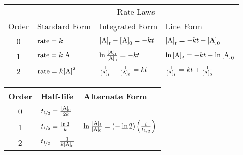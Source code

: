 \documentclass[10pt]{article}
\begin{document}
\begin{table}[H]
    \centering
        \begin{tabular}{clll}
            \toprule
                \multicolumn{1}{c}{} & \multicolumn{3}{c}{Rate Laws}\\
                \cmidrule(l){2-4} 
                Order & Standard Form & Integrated Form & Line Form \\
                \midrule
                0 & $\textnormal{rate}=k$ & $\textnormal{[A]}_t-\textnormal{[A]}_0=-kt$ & $\textnormal{[A]}_t=-kt+\textnormal{[A]}_0$   \\[10pt]
                1 & $\textnormal{rate}=k\textnormal{[A]}$ & $\ln\frac{\textnormal{[A]}_t}{\textnormal{[A]}_0}=-kt$ & $\ln\textnormal{[A]}_t=-kt+\ln\textnormal{[A]}_0$  \\[10pt]
                2 & $\textnormal{rate}=k\textnormal{[A]}^2$ & $\frac{1}{\textnormal{[A]}_t}-\frac{1}{\textnormal{[A]}_0}=kt$ & $\frac{1}{\textnormal{[A]}_t}=kt+\frac{1}{\textnormal{[A]}_0}$  \\
            \bottomrule
        \end{tabular}
    \label{tabrate}
\end{table}
\vspace*{-5pt}
\begin{table}[H]
    \centering
        \begin{tabular}{cll}
            \toprule
                Order & Half-life & Alternate Form\\
                \midrule
                0 & $t_{\nicefrac{1}{2}}=\frac{\textnormal{[A]}_0}{2k}$ & \\[10pt]
                1 & $t_{\nicefrac{1}{2}}=\frac{\ln 2}{k}$ & $\ln\frac{[\textnormal{A}]_t}{[\textnormal{A}]_0} = (-\ln 2)\left(\frac{t}{t_{\nicefrac{1}{2}}}\right)$  \\[10pt]
                2 & $t_{\nicefrac{1}{2}}=\frac{1}{k\textnormal{[A]}_0}$ & \\
            \bottomrule
        \end{tabular}
    \label{tabhalf}
\end{table}

\end{document}
